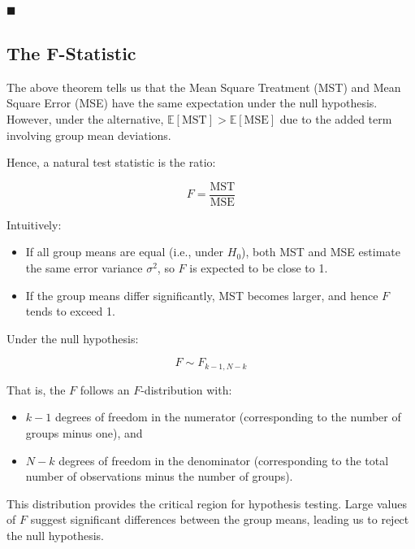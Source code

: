 \documentclass[twoside]{book}
\begin{document}
\hfill $\blacksquare$

\subsection{The F-Statistic}

The above theorem tells us that the Mean Square Treatment (MST) and Mean Square Error (MSE) have the same expectation under the null hypothesis. However, under the alternative, $\mathbb{E}[\text{MST}] > \mathbb{E}[\text{MSE}]$ due to the added term involving group mean deviations.

Hence, a natural test statistic is the ratio:

\begin{textbox}
\begin{equation*}
F = \dfrac{\text{MST}}{\text{MSE}}
\end{equation*}
\end{textbox}

Intuitively:
\begin{itemize}
\item If all group means are equal (i.e., under $H_0$), both MST and MSE estimate the same error variance $\sigma^2$, so $F$ is expected to be close to 1.

\item If the group means differ significantly, MST becomes larger, and hence $F$ tends to exceed 1.
\end{itemize}

Under the null hypothesis:

\begin{textbox}
\begin{equation*}
F \sim F_{k-1, N-k}
\end{equation*}
\end{textbox}

That is, the $F$ follows an $ F $-distribution with:
\begin{itemize}
\item $k-1$ degrees of freedom in the numerator (corresponding to the number of groups minus one), and

\item $N-k$ degrees of freedom in the denominator (corresponding to the total number of observations minus the number of groups).
\end{itemize}
This distribution provides the critical region for hypothesis testing. Large values of $F$ suggest significant differences between the group means, leading us to reject the null hypothesis.
\end{document}
